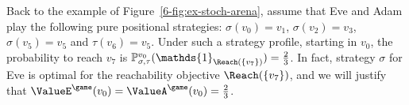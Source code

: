Back to the example of Figure~\ref{6-fig:ex-stoch-arena}, assume that
Eve and Adam play the following pure positional strategies:
$\sigma(v_0) = v_1$, $\sigma(v_2) = v_3$, $\sigma(v_5) = v_5$ and
$\tau(v_6) = v_5$. Under such a strategy profile, starting in $v_0$,
the probability to reach $v_7$ is
$\probm_{\sigma,\tau}^{v_0}(\mathds{1}_{\Reach(\{v_7\})}) = \frac 2
3$. In fact, strategy $\sigma$ for Eve is optimal for the
reachability objective $\Reach(\{v_7\})$, and we will justify that
$\ValueE^\game(v_0) = \ValueA^\game(v_0) = \frac 2 3$.

